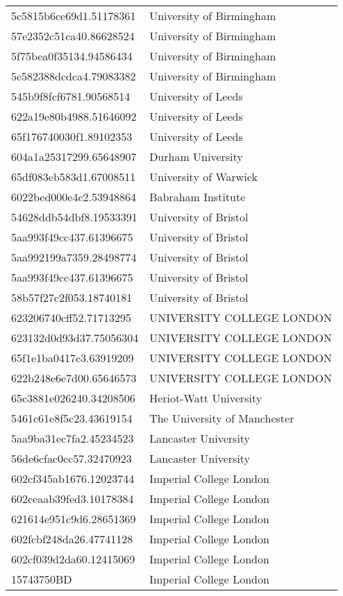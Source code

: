 \begin{tabular}{ll}
5c5815b6ce69d1.51178361 & University of Birmingham \\
57e2352c51ca40.86628524 & University of Birmingham \\
5f75bea0f35134.94586434 & University of Birmingham \\
5c582388dcdca4.79083382 & University of Birmingham \\
545b9f8fcf6781.90568514 & University of Leeds \\
622a19e80b4988.51646092 & University of Leeds \\
65f176740030f1.89102353 & University of Leeds \\
604a1a25317299.65648907 & Durham University \\
65df083eb583d1.67008511 & University of Warwick \\
6022bed000e4c2.53948864 & Babraham Institute \\
54628ddb54dbf8.19533391 & University of Bristol \\
5aa993f49cc437.61396675 & University of Bristol \\
5aa992199a7359.28498774 & University of Bristol \\
5aa993f49cc437.61396675 & University of Bristol \\
58b57f27c2f053.18740181 & University of Bristol \\
623206740cff52.71713295 & UNIVERSITY COLLEGE LONDON \\
623132d0d93d37.75056304 & UNIVERSITY COLLEGE LONDON \\
65f1e1ba0417c3.63919209 & UNIVERSITY COLLEGE LONDON \\
622b248e6e7d00.65646573 & UNIVERSITY COLLEGE LONDON \\
65c3881e026240.34208506 & Heriot-Watt University \\
5461c61e8f5c23.43619154 & The University of Manchester \\
5aa9ba31ec7fa2.45234523 & Lancaster University \\
56de6cfac0cc57.32470923 & Lancaster University \\
602cf345ab1676.12023744 & Imperial College London \\
602ceaab39fed3.10178384 & Imperial College London \\
621614e951c9d6.28651369 & Imperial College London \\
602fcbf248da26.47741128 & Imperial College London \\
602cf039d2da60.12415069 & Imperial College London \\
15743750BD & Imperial College London \\

\end{tabular}
